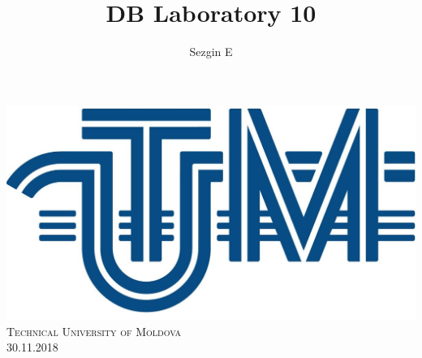 \documentclass[12pt]{article}
\title{DB Laboratory 10}
\author{Sezgin E}
\begin{document}
        
        
        \begin{titlepage}
                \centering
                \vspace*{0.5 cm}
                \includegraphics[scale = 0.11]{LOGO_UTM.jpg}\\[1.0 cm]	%
                \textsc{\LARGE Technical University of Moldova}\\[2.0 cm]%
                \textsc{\Large 30.11.2018}\\[0.5 cm]		%


\end{titlepage}
\end{document}
